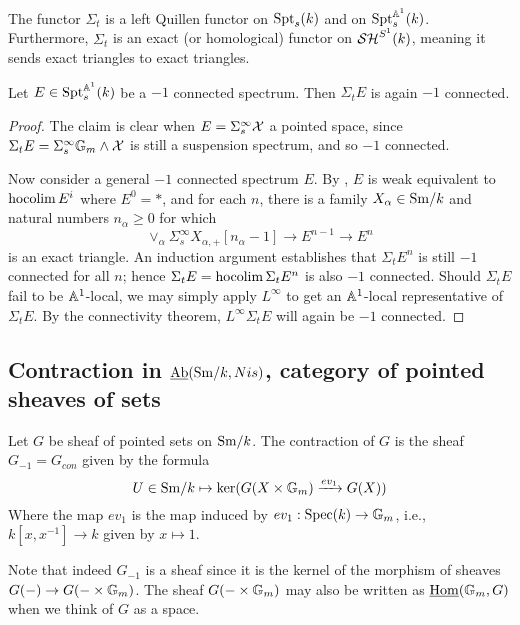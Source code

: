 \documentclass{amsart}%
\begin{document}
\begin{proposition}
  The functor $\Sigma_t$ is a left Quillen functor on $\mathrm{Spt}_s(k)$ and
  on $\mathrm{Spt}_s^{\mathbb{A}^1}(k)$. Furthermore, $\Sigma_t$ is an exact (or
  homological) functor on $\mathcal{SH}^{S^1}(k)$, meaning it sends exact
  triangles to exact triangles.
\end{proposition}

\begin{lemma}
  Let $E \in \mathrm{Spt}_s^{\mathbb{A}^1}(k)$ be a $-1$ connected spectrum. Then
  $\Sigma_t E$ is again $-1$ connected.
\end{lemma}

\begin{proof}
  The claim is clear when $E = \Sigma^{\infty}_s \mathcal{X}$ a pointed
  space, since $\Sigma_t E = \Sigma^{\infty}_s \mathbb{G}_m \wedge \mathcal{X}$ is
  still a suspension spectrum, and so $-1$ connected.

  Now consider a general $-1$ connected spectrum $E$. By \cite[Lemma
  3.3.4]{Mor05}, $E$ is weak equivalent to $ \operatorname{hocolim} E^i$ where
  $E^0 = *$, and for each $n$, there is a family
  $X_{\alpha} \in \mathrm{Sm}/k$ and natural numbers $n_{\alpha}\geq 0$ for
  which
  \begin{equation*}
    \vee_{\alpha}\Sigma^{\infty}_s X_{\alpha,+}[n_{\alpha}-1] \to E^{n-1} \to E^{n}
  \end{equation*}
  is an exact triangle. An induction argument establishes that
  $\Sigma_t E^{n}$ is still $-1$ connected for all $n$; hence
  $\Sigma_t E =\operatorname{hocolim} \Sigma_t E^n$ is also $-1$ connected. Should
  $\Sigma_t E$ fail to be $\mathbb{A}^1$-local, we may simply apply
  $L^{\infty}$ to get an $\mathbb{A}^1$-local representative of
  $\Sigma_t E$. By the connectivity theorem, $L^{\infty}\Sigma_t E$
  will again be $-1$ connected. 
\end{proof}

\subsection{Contraction in $\operatorname{\underline{Ab}}(\mathrm{Sm}/k,Nis)$, category of pointed
  sheaves of sets}

\begin{definition}
  Let $G$ be sheaf of pointed sets on $\mathrm{Sm}/k$. The contraction of $G$
  is the sheaf $G_{-1}=G_{con}$ given by the formula 
  \begin{equation*}
    U \in \mathrm{Sm}/k \mapsto \ker( G(X\times \mathbb{G}_m) \xrightarrow{ev_1} G(X))
  \end{equation*}
  Where the map $ev_1$ is the map induced by
  $ev_1 : \operatorname{Spec}(k) \to \mathbb{G}_m$, i.e., $k[x,x^{-1}] \to k$ given by
  $x\mapsto 1$.

  Note that indeed $G_{-1}$ is a sheaf since it is the kernel of the
  morphism of sheaves $G(-) \to G(-\times \mathbb{G}_m)$. The sheaf
  $G(-\times \mathbb{G}_m)$ may also be written as
  $\underline{\operatorname{Hom}}(\mathbb{G}_m, G)$ when we think of $G$ as a
  space.
\end{definition}
\end{document}
